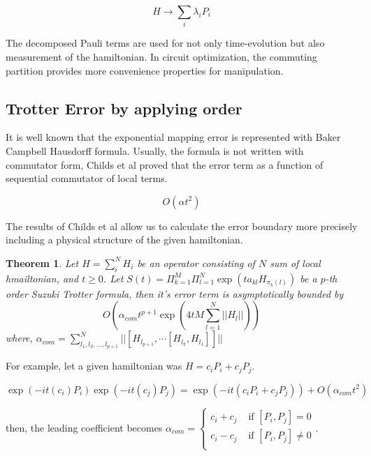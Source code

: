 \documentclass[a4paper,12pt]{article}
\newtheorem{theorem}{Theorem}
\begin{document}
\begin{equation}
    H \rightarrow \sum_i \lambda_i P_i
\end{equation}

The decomposed Pauli terms are used for not only time-evolution
but also measurement of the hamiltonian.
In circuit optimization, the commuting partition 
provides more convenience properties for manipulation.

\subsection{Trotter Error by applying order}

It is well known that the exponential mapping error is represented with Baker Campbell Hausdorff formula.
Usually, the formula is not written with commutator form, Childs et al proved that the error term 
as a function of sequential commutator of local terms\cite{childs_theory_2021}.

\begin{equation}
    O(\alpha t^2)
\end{equation}

The results of Childs et al allow us to calculate 
the error boundary more precisely including a physical structure 
of the given hamiltonian.


\begin{theorem}
    Let $H = \sum_i^N H_i$ be an operator consisting of $N$ sum of local hmailtonian,
    and $t\geq 0$.
    Let $S(t) = \Pi_{k=1}^M \Pi_{l=1}^N \exp(t a_{kl} H_{\pi_k(l)})$ be a $p$-th order
    Suzuki Trotter formula, then it's error term is asymptotically bounded by
    \begin{equation}
        O(\alpha_{com} t^{p+1} \exp(4t M \sum_{l=1}^N || H_l||))
    \end{equation}
    where, $\alpha_{com} = \sum_{l_1, l_2, \dots , l_{p+1}}^N || [H_{l_{p+1}}, \cdots [H_{l_2}, H_{l_1}]]||$
\end{theorem}

For example, let a given hamiltonian was $H = c_i P_i + c_j P_j$.

\begin{equation}
    \exp(-it (c_i) P_i) \exp(-it (c_j) P_j) = \exp(- it (c_i P_i + c_j P_j)) + O (\alpha_{com}t^2)
\end{equation}

then, the leading coefficient becomes $\alpha_{com} = \begin{cases}
    c_i + c_j & \mbox{ if } [P_i, P_j] = 0 \\
    c_i - c_j & \mbox{ if } [P_i, P_j] \neq 0 \\
\end{cases}$.
\end{document}

